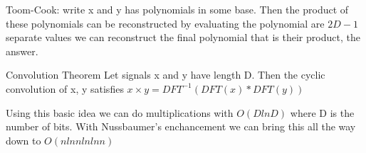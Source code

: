 \documentclass{article}
\begin{document}
\noindent Toom-Cook: write x and y has polynomials in some base. Then the product of these polynomials can be reconstructed by evaluating the polynomial are $2D -1$ separate values we can reconstruct the final polynomial that is their product, the answer. 


\begin{theorem}{Convolution Theorem}
    Let signals x and y have length D. Then the cyclic convolution of x, y satisfies $x \times y = DFT^{-1} (DFT (x) * DFT(y))$
\end{theorem}

Using this basic idea we can do multiplications with $O( D ln D)$ where D is the number of bits. With Nussbaumer's enchancement we can bring this all the way down to $O(n ln n ln ln n)$
\end{document}
